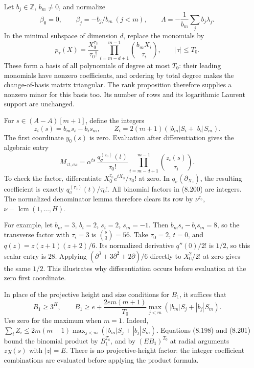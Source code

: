 \documentclass[
  11pt,
  a4paper,
]{article}
\begin{document}
Let \(b_j\in\mathbb Z\), \(b_m\ne0\), and normalize \[
\beta_0=0,\qquad \beta_j=-b_j/b_m\ (j<m),\qquad
\Lambda=-\frac1{b_m}\sum_jb_j\lambda_j.
\] In the minimal subspace of dimension \(d\), replace the monomials by
\[
p_\tau(X)=\frac{X_0^{\tau_0}}{\tau_0!}
\prod_{i=m-d+1}^{m-1}\binom{b_mX_i}{\tau_i},
\qquad |\tau|\le T_0.
\tag{8.199}
\] These form a basis of all polynomials of degree at most \(T_0\):
their leading monomials have nonzero coefficients, and ordering by total
degree makes the change-of-basis matrix triangular. The rank proposition
therefore supplies a nonzero minor for this basis too. Its number of
rows and its logarithmic Laurent support are unchanged.

For \(s\in(A-A)[m+1]\), define the integers \[
z_i(s)=b_ms_i-b_is_m,\qquad
Z_i=2(m+1)(|b_m|S_i+|b_i|S_m).
\] The first coordinate \(y_0(s)\) is zero. Evaluation after
differentiation gives the algebraic entry \[
M_{\tau t,\sigma s}
=\alpha^{ts}\,
\frac{q_\sigma^{(\tau_0)}(t)}{\tau_0!}
\prod_{i=m-d+1}^{m-1}\binom{z_i(s)}{\tau_i}.
\tag{8.200}
\] To check the factor, differentiate \(X_0^{\tau_0}e^{tX_0}/\tau_0!\)
at zero. In \(q_\sigma(\partial_{X_0})\), the resulting coefficient is
exactly \(q_\sigma^{(\tau_0)}(t)/\tau_0!\). All binomial factors in
(8.200) are integers. The normalized denominator lemma therefore clears
its row by \(\nu^{\tau_0}\), \(\nu=\operatorname{lcm}(1,\ldots,H)\).

For example, let \(b_m=3\), \(b_i=2\), \(s_i=2\), \(s_m=-1\). Then
\(b_ms_i-b_is_m=8\), so the transverse factor with \(\tau_i=3\) is
\(\binom83=56\). Take \(\tau_0=2\), \(t=0\), and \(q(z)=z(z+1)(z+2)/6\).
Its normalized derivative \(q''(0)/2!\) is \(1/2\), so this scalar entry
is \(28\). Applying \((\partial^3+3\partial^2+2\partial)/6\) directly to
\(X_0^2/2!\) at zero gives the same \(1/2\). This illustrates why
differentiation occurs before evaluation at the zero first coordinate.

In place of the projective height and size conditions for \(B_1\), it
suffices that \[
B_1\ge3^H,\qquad
B_1\ge e+\frac{2em(m+1)}{T_0}
\max_{j<m}(|b_m|S_j+|b_j|S_m).
\tag{8.201}
\] Use zero for the maximum when \(m=1\). Indeed,
\(\sum_iZ_i\le2m(m+1)\max_{j<m}(|b_m|S_j+|b_j|S_m)\). Equations (8.198)
and (8.201) bound the binomial product by \(B_1^{T_0}\), and by
\((EB_1)^{T_0}\) at radial arguments \(z\,y(s)\) with \(|z|=E\). There
is no projective-height factor: the integer coefficient combinations are
evaluated before applying the product formula.
\end{document}

